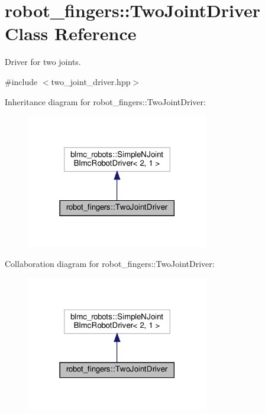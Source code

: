 \hypertarget{classrobot__fingers_1_1TwoJointDriver}{}\section{robot\+\_\+fingers\+:\+:Two\+Joint\+Driver Class Reference}
\label{classrobot__fingers_1_1TwoJointDriver}


Driver for two joints.  




{\ttfamily \#include $<$two\+\_\+joint\+\_\+driver.\+hpp$>$}



Inheritance diagram for robot\+\_\+fingers\+:\+:Two\+Joint\+Driver\+:
\nopagebreak
\begin{figure}[H]
\begin{center}
\leavevmode
\includegraphics[width=225pt]{classrobot__fingers_1_1TwoJointDriver__inherit__graph}
\end{center}
\end{figure}


Collaboration diagram for robot\+\_\+fingers\+:\+:Two\+Joint\+Driver\+:
\nopagebreak
\begin{figure}[H]
\begin{center}
\leavevmode
\includegraphics[width=225pt]{classrobot__fingers_1_1TwoJointDriver__coll__graph}
\end{center}
\end{figure}
